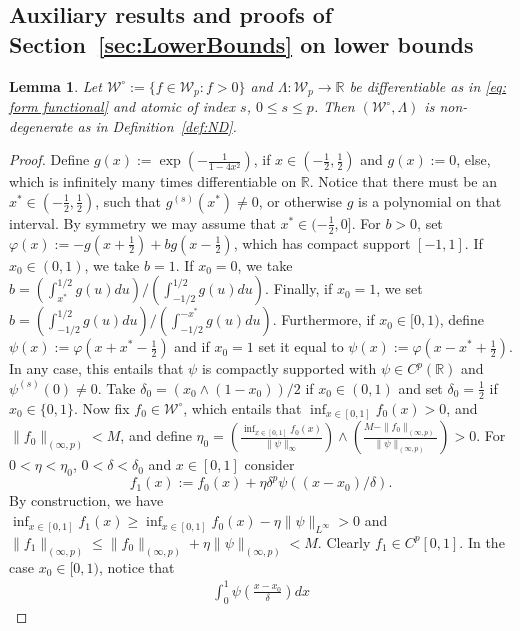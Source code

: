 \documentclass[preprint]{imsart}
\newcommand{\R}{{\mathbb R}}
\newtheorem{lemma}[theorem]{Lemma}
\numberwithin{equation}{section}
\begin{document}
\begin{appendix}
\section{Auxiliary results and proofs of Section~\ref{sec:LowerBounds} on lower bounds}
\label{app:LB}

\begin{lemma}\label{lemma:W0}
    Let $\mathcal W^\circ := \{f\in\mathcal W_p : f>0\}$ and $\Lambda:\mathcal W_p \to \mathbb R$ be differentiable as in \eqref{eq: form functional} and atomic of index $s$, $0\le s\le p$. Then $(\mathcal W^\circ,\Lambda)$ is non-degenerate as in Definition~\ref{def:ND}.
\end{lemma}
\begin{proof}
    Define $g(x):= \exp\left(-\frac{1}{1-4x^2} \right)$,  if $x\in(-\frac12,\frac12)$ and $g(x) := 0$, else, which is infinitely many times differentiable on $\R$. Notice that there must be an $x^*\in(-\frac12,\frac12)$, such that $g^{(s)}(x^*)\neq 0$, or otherwise $g$ is a polynomial on that interval. By symmetry we may assume that $x^*\in(-\frac12,0]$. For $b>0$, set $\varphi(x) := -g(x+\frac12) + bg(x-\frac12)$, which has compact support $[-1,1]$. If $x_0\in(0,1)$, we take $b=1$. If $x_0=0$, we take $b=(\int_{x^*}^{1/2}g(u)du )/(\int_{-1/2}^{1/2} g(u)du )$. Finally, if $x_0=1$, we set $b=(\int_{-1/2}^{1/2} g(u)du )/(\int_{-1/2}^{-x^*}g(u)du )$. Furthermore, if $x_0\in[0,1)$, define $\psi(x) := \varphi(x+x^*-\frac12)$ and if $x_0=1$ set it equal to $\psi(x) := \varphi(x-x^*+\frac12)$. 
    In any case, this entails that $\psi$ is compactly supported with $\psi\in C^p(\R)$ and $\psi^{(s)}(0) \neq 0$. Take $\delta_0=(x_0\land(1-x_0))/2$ if $x_0\in(0,1)$ and set $\delta_0=\frac12$ if $x_0\in\{0,1\}$. Now fix $f_0\in \mathcal W^\circ$, which entails that $\inf_{x\in[0,1]}f_0(x)>0$, and $\|f_0\|_{(\infty,p)}<M$, and define $\eta_0 = \left(\frac{\inf_{x\in[0,1]}f_0(x)}{\|\psi\|_\infty} \right)\land\left( \frac{M-\|f_0\|_{(\infty,p)}}{\|\psi\|_{(\infty,p)}}\right)>0$. For $0<\eta<\eta_0$, $0<\delta<\delta_0$ and $x\in[0,1]$ consider 
    $$
    f_1(x) := f_0(x) + \eta\delta^p\psi((x-x_0)/\delta).
    $$
    By construction, we have $\inf_{x\in[0,1]}f_1(x)\ge \inf_{x\in[0,1]}f_0(x) - \eta\|\psi\|_{L^\infty}>0$ and $\|f_1\|_{(\infty,p)} \le \|f_0\|_{(\infty,p)} + \eta\|\psi\|_{(\infty,p)} < M$. Clearly $f_1\in C^p[0,1]$. In the case $x_0\in[0,1)$, notice that
    \begin{align*}
        \int_0^1 \psi\left( \frac{x-x_0}{\delta}\right)dx

\end{align*}
\end{proof}
\end{appendix}
\end{document}

